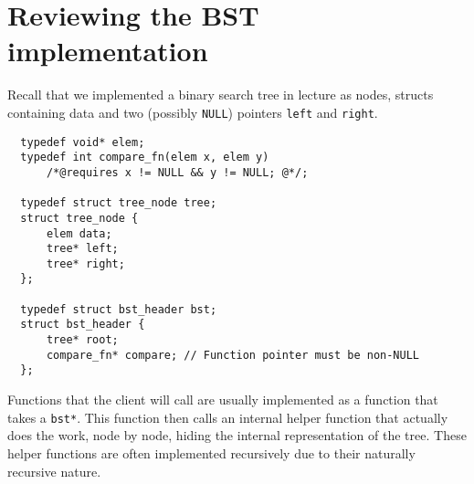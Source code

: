 \section*{Reviewing the BST implementation}

Recall that we implemented a binary search tree in lecture as nodes, structs
containing data and two (possibly \lstinline'NULL') pointers
\lstinline'left' and \lstinline'right'.

\bgroup
\smalllistings
\begin{lstlisting}
  typedef void* elem;
  typedef int compare_fn(elem x, elem y)
      /*@requires x != NULL && y != NULL; @*/;

  typedef struct tree_node tree;
  struct tree_node {
      elem data;
      tree* left;
      tree* right;
  };

  typedef struct bst_header bst;
  struct bst_header {
      tree* root;
      compare_fn* compare; // Function pointer must be non-NULL
  };
\end{lstlisting}

Functions that the client will call are usually implemented as a
function that takes a \lstinline'bst*'.  This function then calls an
internal helper function that actually does the work, node by node,
hiding the internal representation of the tree.  These helper
functions are often implemented recursively due to their naturally
recursive nature.

\egroup